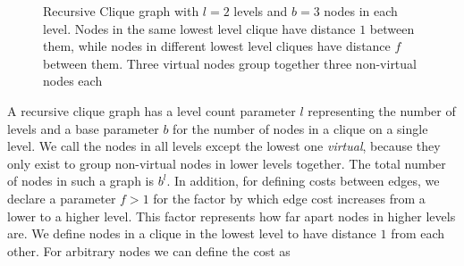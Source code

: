 \documentclass[a4paper, oneside]{discothesis}
\begin{document}
\begin{figure}[H]
\centering
{}
\caption{Recursive Clique graph with $l=2$ levels and $b=3$ nodes in each level. Nodes in the same lowest level clique have distance $1$ between them, while nodes in different lowest level cliques have distance $f$ between them. Three virtual nodes group together three non-virtual nodes each}
\label{fig:reclique}
\end{figure}

A recursive clique graph has a level count parameter $l$ representing the number of levels and a base parameter $b$ for the number of nodes in a clique on a single level. We call the nodes in all levels except the lowest one \textit{virtual}, because they only exist to group non-virtual nodes in lower levels together. The total number of nodes in such a graph is $b^l$. In addition, for defining costs between edges, we declare a parameter $f>1$ for the factor by which edge cost increases from a lower to a higher level. This factor represents how far apart nodes in higher levels are. We define nodes in a clique in the lowest level to have distance $1$ from each other. For arbitrary nodes we can define the cost as
\end{document}
